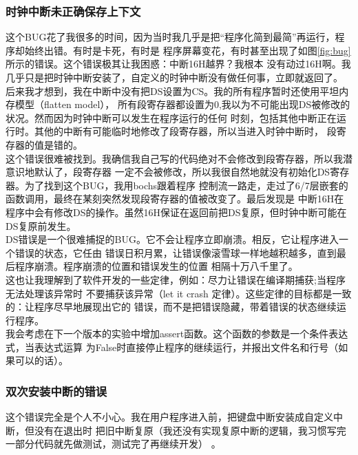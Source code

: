 \documentclass[a4paper]{article}
\begin{document}
    \subsubsection{时钟中断未正确保存上下文}
    这个BUG花了我很多的时间，因为当时我几乎是把``程序化简到最简''再运行，程序却始终出错。有时是卡死，有时是
    程序屏幕变花，有时甚至出现了如图\ref{fig:bug}所示的错误。这个错误极其让我困惑：中断16H越界？我根本
    没有动过16H啊。我几乎只是把时钟中断安装了，自定义的时钟中断没有做任何事，立即就返回了。\\

    后来我才想到，我在中断中没有把DS设置为CS。我的所有程序暂时还使用平坦内存模型（flatten model），
    所有段寄存器都设置为0,我以为不可能出现DS被修改的状况。然而因为时钟中断可以发生在程序运行的任何
    时刻，包括其他中断正在运行时。其他的中断有可能临时地修改了段寄存器，所以当进入时钟中断时，
    段寄存器的值是错的。\\
    
    这个错误很难被找到。我确信我自己写的代码绝对不会修改到段寄存器，所以我潜意识地默认了，段寄存器
    一定不会被修改，所以我很自然地就没有初始化DS寄存器。为了找到这个BUG，我用bochs跟着程序
    控制流一路走，走过了6/7层嵌套的函数调用，最终在某刻突然发现段寄存器的值被改变了。最后发现是
    中断16H在程序中会有修改DS的操作。虽然16H保证在返回前把DS复原，但时钟中断可能在DS复原前发生。\\ 

    DS错误是一个很难捕捉的BUG。它不会让程序立即崩溃。相反，它让程序进入一个错误的状态，它任由
    错误日积月累，让错误像滚雪球一样地越积越多，直到最后程序崩溃。程序崩溃的位置和错误发生的位置
    相隔十万八千里了。\\
    
    这也让我理解到了软件开发的一些定律，例如：尽力让错误在编译期捕获;当程序无法处理该异常时
    不要捕获该异常（let it crash 定律）。这些定律的目标都是一致的：让程序尽早地展现出它的
    错误，而不是把错误隐藏，带着错误的状态继续运行程序。\\
    
    我会考虑在下一个版本的实验中增加assert函数。这个函数的参数是一个条件表达式，当表达式运算
    为False时直接停止程序的继续运行，并报出文件名和行号（如果可以的话）。
    \subsubsection{双次安装中断的错误}
    这个错误完全是个人不小心。我在用户程序进入前，把键盘中断安装成自定义中断，但没有在退出时
    把旧中断复原（我还没有实现复原中断的逻辑，我习惯写完一部分代码就先做测试，测试完了再继续开发）
    。\\
    
\end{document}
